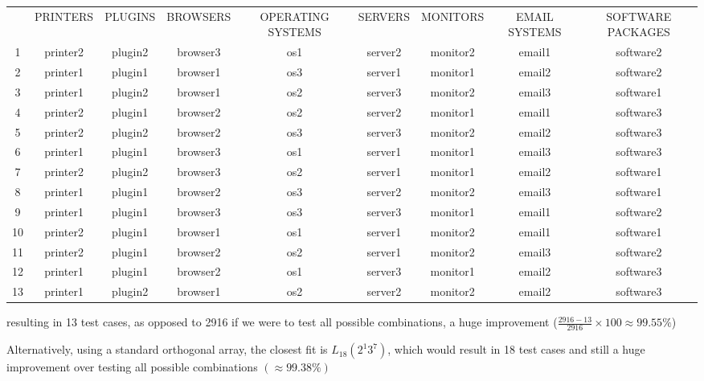 \documentclass[letterpaper]{article}
\begin{document}
\begin{adjustbox}{max width=1.5\textwidth, center}
	\begin{tabular}{ccccccccc}
		   & PRINTERS & PLUGINS & BROWSERS & OPERATING SYSTEMS & SERVERS & MONITORS & EMAIL SYSTEMS & SOFTWARE PACKAGES \\
		1  & printer2 & plugin2 & browser3 & os1               & server2 & monitor2 & email1        & software2         \\
		2  & printer1 & plugin1 & browser1 & os3               & server1 & monitor1 & email2        & software2         \\
		3  & printer1 & plugin2 & browser1 & os2               & server3 & monitor2 & email3        & software1         \\
		4  & printer2 & plugin1 & browser2 & os2               & server2 & monitor1 & email1        & software3         \\
		5  & printer2 & plugin2 & browser2 & os3               & server3 & monitor2 & email2        & software3         \\
		6  & printer1 & plugin1 & browser3 & os1               & server1 & monitor1 & email3        & software3         \\
		7  & printer2 & plugin2 & browser3 & os2               & server1 & monitor1 & email2        & software1         \\
		8  & printer1 & plugin1 & browser2 & os3               & server2 & monitor2 & email3        & software1         \\
		9  & printer1 & plugin1 & browser3 & os3               & server3 & monitor1 & email1        & software2         \\
		10 & printer2 & plugin1 & browser1 & os1               & server1 & monitor2 & email1        & software1         \\
		11 & printer2 & plugin1 & browser2 & os2               & server1 & monitor2 & email3        & software2         \\
		12 & printer1 & plugin1 & browser2 & os1               & server3 & monitor1 & email2        & software3         \\
		13 & printer1 & plugin2 & browser1 & os2               & server2 & monitor2 & email2        & software3
	\end{tabular}%
\end{adjustbox}
\vspace{20pt}

resulting in 13 test cases, as opposed to 2916 if we were to test all possible
combinations, a huge improvement ($\frac{2916-13}{2916} \times 100 \approx 99.55\%$)

Alternatively, using a standard orthogonal array, the closest fit is
$L_{18}(2^1 3^7)$, which would result in 18 test cases and still a huge
improvement over testing all possible combinations $(\approx 99.38\%)$
\end{document}
